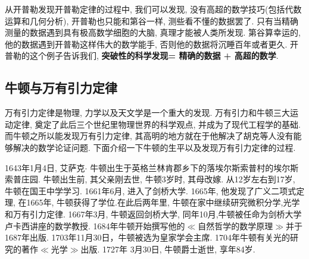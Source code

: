 \documentclass[11pt,a4paper,boxed]{caspset}
\newlength\picwidth
\newlength\pichigh
\begin{document}
从开普勒发现开普勒定律的过程中, 我们可以发现, 没有高超的数学技巧(包括代数运算和几何分析), 开普勒也只能和第谷一样, 测些看不懂的数据罢了. 只有当精确测量的数据遇到具有极高数学细胞的大脑, 真理才能被人类所发现. 第谷算幸运的, 他的数据遇到开普勒这样伟大的数学能手, 否则他的数据将沉睡百年或者更久. 开普勒的这个例子告诉我们, \textbf{突破性的科学发现{}= 精确的数据 + 高超的数学}.

\subsection{牛顿与万有引力定律}
万有引力定律是物理, 力学以及天文学是一个重大的发现. 万有引力和牛顿三大运动定律, 奠定了此后三个世纪里物理世界的科学观点, 并成为了现代工程学的基础.
而牛顿之所以能发现万有引力定律, 其高明的地方就在于他解决了胡克等人没有能够解决的数学论证问题. 下面介绍一下牛顿的生平以及发现万有引力定律的过程.
\begin{window}
1643年1月4日, 艾萨克$\cdot$ 牛顿出生于英格兰林肯郡乡下的落埃尔斯索普村的埃尔斯索普庄园.
牛顿出生前, 其父亲刚去世, 牛顿3岁时, 其母改嫁. 从12岁左右到17岁, 牛顿在国王中学学习. 1661年6月, 进入了剑桥大学. 1665年, 他发现了广义二项式定理, 在1665年, 牛顿获得了学位.在此后两年里, 牛顿在家中继续研究微积分学,光学和万有引力定律.
1667年3月, 牛顿返回剑桥大学, 同年10月,牛顿被任命为剑桥大学卢卡西讲座的数学教授.
1684年牛顿开始撰写他的$\ll$自然哲学的数学原理$\gg$并于1687年出版.
1703年11月30日，牛顿被选为皇家学会主席.
1704年牛顿有关光的研究的著作$\ll$光学$\gg$出版.
1727年 3月30日, 牛顿爵士逝世, 享年84岁.
\end{window}
\end{document}
